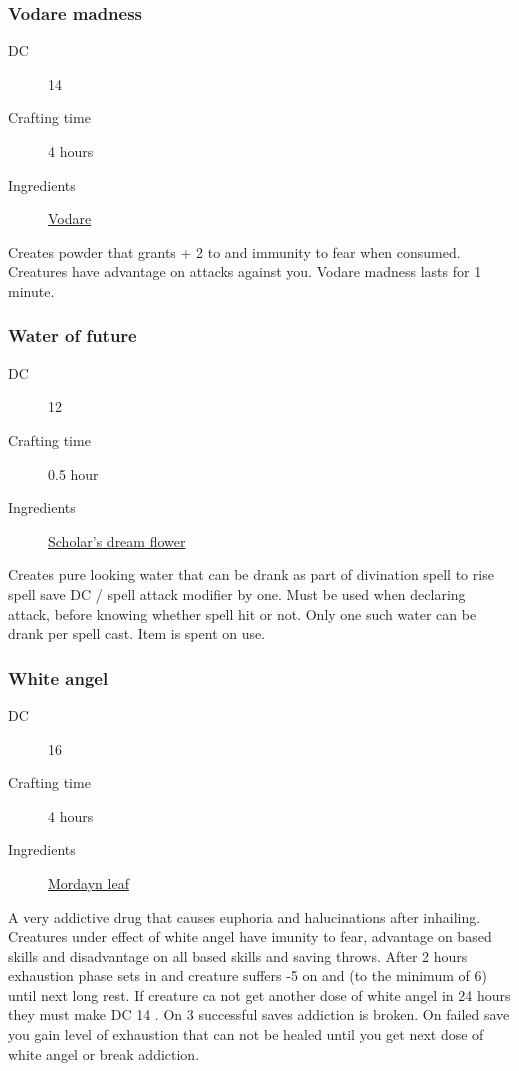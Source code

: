 \subsubsection{Vodare madness}
\label{Vodare madness}

\begin{description}
\item [DC] 14 \survival
\item [Crafting time] 4 hours
\item [Ingredients] \hyperref[Vodare]{Vodare}
\end{description}

Creates powder that grants + 2 to \intimidation and immunity to fear when consumed. 
Creatures have advantage on attacks against you. Vodare madness lasts for 1 minute.

\subsubsection{Water of future}
\label{Water of future}

\begin{description}
\item [DC] 12 \arcana
\item [Crafting time] 0.5 hour
\item [Ingredients] \hyperref[Scholar's dream]{Scholar's dream flower}
\end{description}

Creates pure looking water that can be drank as part of divination spell to rise  spell save DC / spell attack modifier by one. Must be used when declaring attack, before knowing whether spell hit or not. Only one such water can be drank per spell cast. Item is spent on use.

\subsubsection{White angel}
\label{White angel}

\begin{description}
\item [DC] 16 \nature
\item [Crafting time] 4 hours
\item [Ingredients] \hyperref[Mordayn]{Mordayn leaf}
\end{description}

A very addictive drug that causes euphoria and halucinations after inhailing. 
Creatures under effect of white angel have imunity to fear, advantage on \charisma{} based skills and disadvantage
 on all \intelligence{} based skills and saving throws. 
 After 2 hours exhaustion phase sets in and creature suffers -5 on \dexterity{} and \strength{} (to the minimum of 6) 
 until next long rest. If creature ca not get another dose of white angel in 24 hours they must make 
 DC 14 \constitutionsave. On 3 successful saves addiction is broken. 
 On failed save you gain level of exhaustion that can not be healed until you get next dose of white angel or break addiction.

